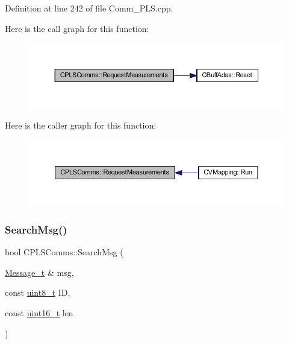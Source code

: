 Definition at line 242 of file Comm\+\_\+\+P\+L\+S.\+cpp.

Here is the call graph for this function\+:
\nopagebreak
\begin{figure}[H]
\begin{center}
\leavevmode
\includegraphics[width=350pt]{class_c_p_l_s_comms_ab69a49f5c4cd7b4b9f63fa16c7792920_cgraph}
\end{center}
\end{figure}
Here is the caller graph for this function\+:
\nopagebreak
\begin{figure}[H]
\begin{center}
\leavevmode
\includegraphics[width=350pt]{class_c_p_l_s_comms_ab69a49f5c4cd7b4b9f63fa16c7792920_icgraph}
\end{center}
\end{figure}
\mbox{\label{class_c_p_l_s_comms_a14754b4119b9a3d613579c2a80220cc0}} 
\subsubsection{\texorpdfstring{Search\+Msg()}{SearchMsg()}}
{\footnotesize\ttfamily bool C\+P\+L\+S\+Comms\+::\+Search\+Msg (\begin{DoxyParamCaption}\item[{\mbox{\hyperlink{struct_c_p_l_s_comms_1_1_message__t}{Message\+\_\+t}} \&}]{msg,  }\item[{const \mbox{\hyperlink{_a_d_a_s___types_8h_aba7bc1797add20fe3efdf37ced1182c5}{uint8\+\_\+t}}}]{ID,  }\item[{const \mbox{\hyperlink{_a_d_a_s___types_8h_a1f1825b69244eb3ad2c7165ddc99c956}{uint16\+\_\+t}}}]{len }\end{DoxyParamCaption})}



